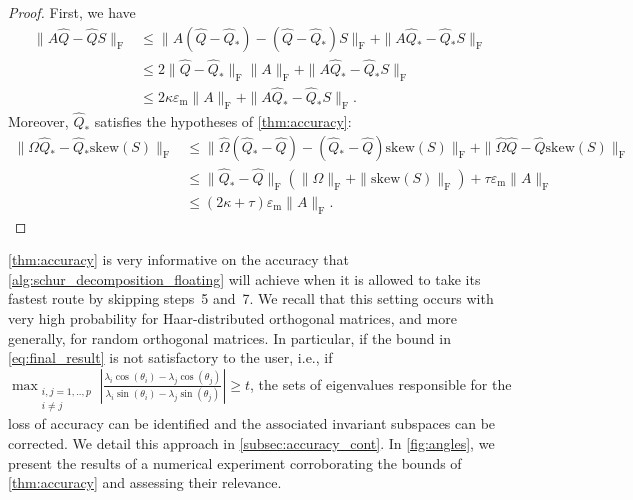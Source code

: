 \documentclass[10pt,twoside,dvipsnames]{siamart1116}
\numberwithin{algorithm}{section}
\numberwithin{equation}{section}
\begin{document}
	\begin{proof}
	First, we have 
	\begin{align*}
		\|A\widehat{Q} - \widehat{Q}S\|_\mathrm{F}&\leq \|A(\widehat{Q}-\widehat{Q}_*) - (\widehat{Q}-\widehat{Q}_*)S\|_\mathrm{F} +  \|A\widehat{Q}_* - \widehat{Q}_*S\|_\mathrm{F}\\
		&\leq 2\|\widehat{Q}-\widehat{Q}_*\|_\mathrm{F}\|A\|_\mathrm{F} +  \|A\widehat{Q}_* - \widehat{Q}_*S\|_\mathrm{F}\\
		&\leq 2\kappa \varepsilon_\mathrm{m} \|A\|_\mathrm{F} + \|A\widehat{Q}_* - \widehat{Q}_*S\|_\mathrm{F}.
	\end{align*}
	Moreover, $\widehat{Q}_*$ satisfies the hypotheses of \cref{thm:accuracy}:
	\begin{align*}
		\|\Omega\widehat{Q}_*-\widehat{Q}_* \mathrm{skew}(S)\|_\mathrm{F}&\leq \|\widehat{\Omega} (\widehat{Q}_*-\widehat{Q})-(\widehat{Q}_*-\widehat{Q}) \mathrm{skew}(S)\|_\mathrm{F}+\|\widehat{\Omega} \widehat{Q}-\widehat{Q} \mathrm{skew}(S)\|_\mathrm{F}\\
		&\leq\|\widehat{Q}_*-\widehat{Q}\|_\mathrm{F}(\|\Omega\|_\mathrm{F} +  \|\mathrm{skew}(S)\|_\mathrm{F})+\tau \varepsilon_\mathrm{m} \|A\|_\mathrm{F}\\
		&\leq (2\kappa + \tau )\varepsilon_\mathrm{m} \|A\|_\mathrm{F}.
	\end{align*}
	\end{proof}
	\cref{thm:accuracy} is very informative on the accuracy that \cref{alg:schur_decomposition_floating} will achieve when it is allowed to take its fastest route by skipping steps~5 and~7. We recall that this setting occurs with very high probability for Haar-distributed orthogonal matrices, and more generally, for random orthogonal matrices. In particular, if the bound in \eqref{eq:final_result} is not satisfactory to the user, i.e., if $\max_{\substack{i,j=1,..,p \\ i\neq j}}\left|\frac{\lambda_i\cos(\theta_i)-\lambda_j \cos(\theta_j)}{\lambda_i \sin(\theta_i)-\lambda_j \sin(\theta_j)}\right|\geq t$, the sets of eigenvalues responsible for the loss of accuracy can be identified and the associated invariant subspaces can be corrected. We detail this approach in \cref{subsec:accuracy_cont}. In \cref{fig:angles}, we present the results of a numerical experiment corroborating the bounds of \cref{thm:accuracy} and assessing their relevance.
\end{document}
